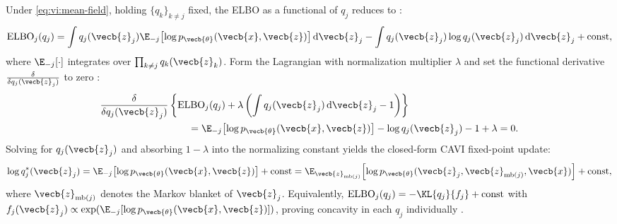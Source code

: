 \documentclass[../../../../master.tex]{subfiles}
\begin{document}
\begin{coremath}
Under \eqref{eq:vi:mean-field}, holding $\{q_k\}_{k \neq j}$ fixed, the ELBO as a functional of $q_j$ reduces to  :
\begin{equation}
  \mathrm{ELBO}_j(q_j) = \int q_j(\vecb{z}_j) \E_{-j}\!\left[\log p_{\vecb{\theta}}(\vecb{x}, \vecb{z})\right]\mathrm{d}\vecb{z}_j - \int q_j(\vecb{z}_j) \log q_j(\vecb{z}_j)\,\mathrm{d}\vecb{z}_j + \mathrm{const},
  \label{eq:vi:cavi-functional}
\end{equation}
where $\E_{-j}[\cdot]$ integrates over $\prod_{k \neq j} q_k(\vecb{z}_k)$. Form the Lagrangian with normalization multiplier $\lambda$ and set the functional derivative $\frac{\delta}{\delta q_j(\vecb{z}_j)}$ to zero :
\begin{align}
  \frac{\delta}{\delta q_j(\vecb{z}_j)} &\left\{ \mathrm{ELBO}_j(q_j) + \lambda \left(\int q_j(\vecb{z}_j)\,\mathrm{d}\vecb{z}_j - 1\right) \right\} \nonumber \\
  &\qquad = \E_{-j}\!\left[\log p_{\vecb{\theta}}(\vecb{x}, \vecb{z})\right] - \log q_j(\vecb{z}_j) - 1 + \lambda = 0.
\end{align}
Solving for $q_j(\vecb{z}_j)$ and absorbing $1 - \lambda$ into the normalizing constant yields the closed-form CAVI fixed-point update:
\begin{equation}
  \log q_j^*(\vecb{z}_j) = \E_{-j}\!\left[\log p_{\vecb{\theta}}(\vecb{x}, \vecb{z})\right] + \mathrm{const} = \E_{\vecb{z}_{\mathrm{mb}(j)}}\!\left[\log p_{\vecb{\theta}}(\vecb{z}_j, \vecb{z}_{\mathrm{mb}(j)}, \vecb{x})\right] + \mathrm{const},
  \label{eq:vi:cavi-update}
\end{equation}
where $\vecb{z}_{\mathrm{mb}(j)}$ denotes the Markov blanket of $\vecb{z}_j$. Equivalently, $\mathrm{ELBO}_j(q_j) = -\KL{q_j}{f_j} + \mathrm{const}$ with $f_j(\vecb{z}_j) \propto \exp(\E_{-j}[\log p_{\vecb{\theta}}(\vecb{x}, \vecb{z})])$, proving concavity in each $q_j$ individually .
\end{coremath}
\end{document}
